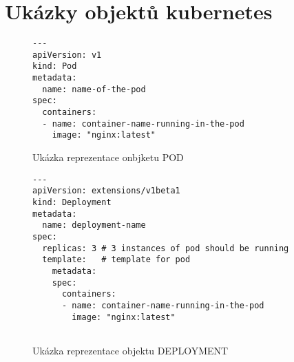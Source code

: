 \chapter{Ukázky objektů kubernetes}
\begin{figure}
\caption{Ukázka reprezentace onbjketu POD}
\label{fig:def_pod}
\begin{verbatim}
---
apiVersion: v1
kind: Pod
metadata:
  name: name-of-the-pod
spec:
  containers:
  - name: container-name-running-in-the-pod
    image: "nginx:latest"       
\end{verbatim}
\end{figure}

\begin{figure}
\caption{Ukázka reprezentace objektu DEPLOYMENT}
\label{fig:def_deployment}
\begin{verbatim}
---
apiVersion: extensions/v1beta1
kind: Deployment
metadata:
  name: deployment-name
spec:
  replicas: 3 # 3 instances of pod should be running
  template:   # template for pod
    metadata:
    spec:
      containers:
      - name: container-name-running-in-the-pod
        image: "nginx:latest"       
      
\end{verbatim}
\end{figure}

